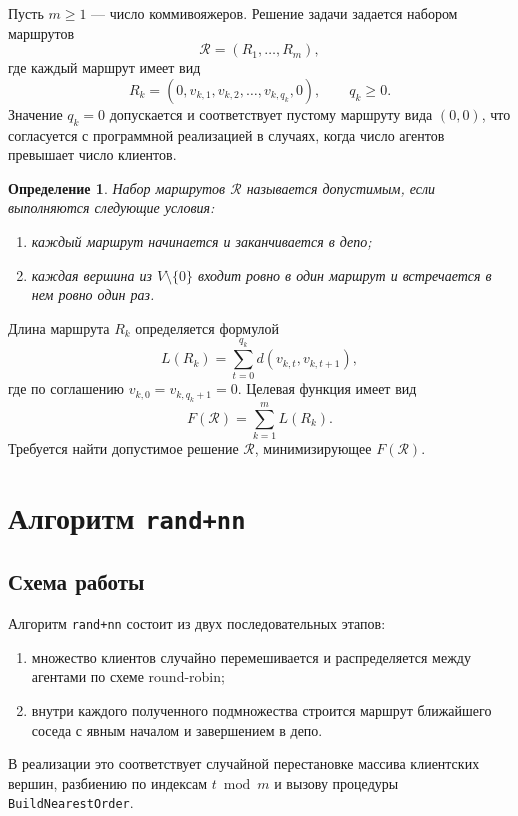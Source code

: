 \documentclass[a4paper,12pt]{article}
\newtheorem{definition}{Определение}[section]
\newcommand{\dist}{d}
\newcommand{\obj}{F}
\newcommand{\clients}{V \setminus \{0\}}
\begin{document}
Пусть \(m \ge 1\) --- число коммивояжеров. Решение задачи задается набором маршрутов
\[
\mathcal{R} = (R_1,\dots,R_m),
\]
где каждый маршрут имеет вид
\[
R_k = (0, v_{k,1}, v_{k,2}, \dots, v_{k,q_k}, 0), \qquad q_k \ge 0.
\]
Значение \(q_k = 0\) допускается и соответствует пустому маршруту вида \((0,0)\), что
согласуется с программной реализацией в случаях, когда число агентов превышает число клиентов.

\begin{definition}
Набор маршрутов \(\mathcal{R}\) называется \emph{допустимым}, если выполняются следующие
условия:
\begin{enumerate}[label=\arabic*.]
  \item каждый маршрут начинается и заканчивается в депо;
  \item каждая вершина из \(\clients\) входит ровно в один маршрут и встречается в нем
  ровно один раз.
\end{enumerate}
\end{definition}

Длина маршрута \(R_k\) определяется формулой
\[
L(R_k) = \sum_{t=0}^{q_k} \dist(v_{k,t},v_{k,t+1}),
\]
где по соглашению \(v_{k,0} = v_{k,q_k+1} = 0\).
Целевая функция имеет вид
\[
\obj(\mathcal{R}) = \sum_{k=1}^{m} L(R_k).
\]
Требуется найти допустимое решение \(\mathcal{R}\), минимизирующее \(\obj(\mathcal{R})\).

\section{Алгоритм \texttt{rand+nn}}

\subsection{Схема работы}

Алгоритм \texttt{rand+nn} состоит из двух последовательных этапов:
\begin{enumerate}[label=\arabic*.]
  \item множество клиентов случайно перемешивается и распределяется между агентами по
  схеме round-robin;
  \item внутри каждого полученного подмножества строится маршрут ближайшего соседа с
  явным началом и завершением в депо.
\end{enumerate}

В реализации это соответствует случайной перестановке массива клиентских вершин, разбиению
по индексам \(t \bmod m\) и вызову процедуры \texttt{BuildNearestOrder}.
\end{document}
